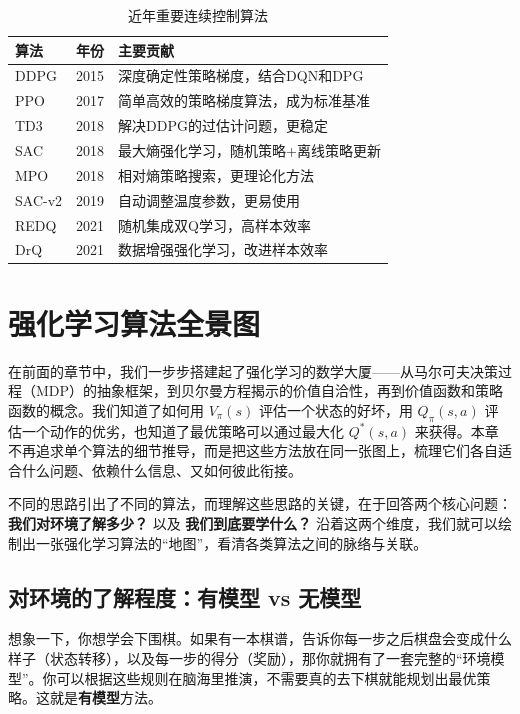 \documentclass[lang=cn,zihao=-4,a4paper,fontset=windows]{beautybook}
\begin{document}
\begin{table}[H]
\centering
\caption{近年重要连续控制算法}
\begin{tabular}{p{}p{}p{}}
\toprule
\textbf{算法} & \textbf{年份} & \textbf{主要贡献} \\
\midrule
DDPG & 2015 & 深度确定性策略梯度，结合DQN和DPG \\
PPO & 2017 & 简单高效的策略梯度算法，成为标准基准 \\
TD3 & 2018 & 解决DDPG的过估计问题，更稳定 \\
SAC & 2018 & 最大熵强化学习，随机策略+离线策略更新 \\
MPO & 2018 & 相对熵策略搜索，更理论化方法 \\
SAC-v2 & 2019 & 自动调整温度参数，更易使用 \\
REDQ & 2021 & 随机集成双Q学习，高样本效率 \\
DrQ & 2021 & 数据增强强化学习，改进样本效率 \\
\bottomrule
\end{tabular}
\end{table}


\chapter{强化学习算法全景图}

在前面的章节中，我们一步步搭建起了强化学习的数学大厦——从马尔可夫决策过程（MDP）的抽象框架，到贝尔曼方程揭示的价值自洽性，再到价值函数和策略函数的概念。我们知道了如何用 \(V_\pi(s)\) 评估一个状态的好坏，用 \(Q_\pi(s,a)\) 评估一个动作的优劣，也知道了最优策略可以通过最大化 \(Q^*(s,a)\) 来获得。本章不再追求单个算法的细节推导，而是把这些方法放在同一张图上，梳理它们各自适合什么问题、依赖什么信息、又如何彼此衔接。

不同的思路引出了不同的算法，而理解这些思路的关键，在于回答两个核心问题：\textbf{我们对环境了解多少？} 以及 \textbf{我们到底要学什么？} 沿着这两个维度，我们就可以绘制出一张强化学习算法的“地图”，看清各类算法之间的脉络与关联。

\section{对环境的了解程度：有模型 vs 无模型}

想象一下，你想学会下围棋。如果有一本棋谱，告诉你每一步之后棋盘会变成什么样子（状态转移），以及每一步的得分（奖励），那你就拥有了一套完整的“环境模型”。你可以根据这些规则在脑海里推演，不需要真的去下棋就能规划出最优策略。这就是\textbf{有模型}方法。
\end{document}
